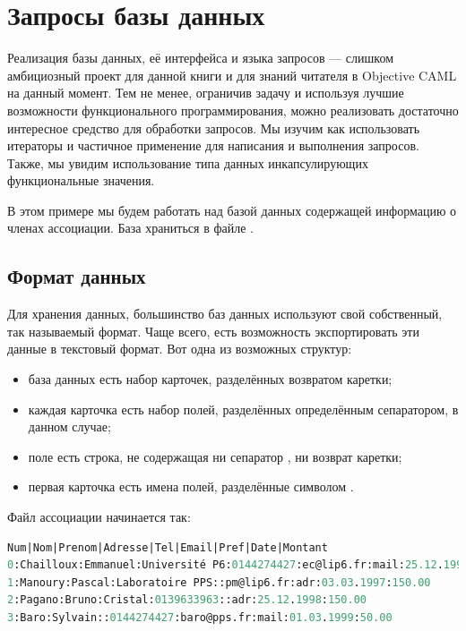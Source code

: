 \section{Запросы базы данных}
\label{sec:database_queries}

Реализация базы данных, её интерфейса и языка запросов --- слишком амбициозный 
проект для данной книги и для знаний читателя в Objective CAML на данный момент. 
Тем не менее, ограничив задачу и используя лучшие возможности функционального 
программирования, можно реализовать достаточно интересное средство для обработки 
запросов. Мы изучим как использовать итераторы и частичное применение для 
написания и выполнения запросов. Также, мы увидим использование типа данных 
инкапсулирующих функциональные значения.

В этом примере мы будем работать над базой данных содержащей информацию о членах 
ассоциации. База храниться в файле .

\subsection{Формат данных}
\label{subsec:data_format}

Для хранения данных, большинство баз данных используют свой собственный, так 
называемый  формат. Чаще всего, есть возможность 
экспортировать эти данные в текстовый формат. Вот одна из возможных структур:

\begin{itemize}
	\item база данных есть набор карточек, разделённых возвратом каретки;

	\item каждая карточка есть набор полей, разделённых определённым 
сепаратором,  в данном случае;

	\item поле есть строка, не содержащая ни сепаратор , ни возврат 
каретки;

	\item первая карточка есть имена полей, разделённые символом .
\end{itemize}

Файл ассоциации начинается так:

\begin{lstlisting}[language=OCaml]
Num|Nom|Prenom|Adresse|Tel|Email|Pref|Date|Montant
0:Chailloux:Emmanuel:Université P6:0144274427:ec@lip6.fr:mail:25.12.1998:100.00
1:Manoury:Pascal:Laboratoire PPS::pm@lip6.fr:adr:03.03.1997:150.00
2:Pagano:Bruno:Cristal:0139633963::adr:25.12.1998:150.00
3:Baro:Sylvain::0144274427:baro@pps.fr:mail:01.03.1999:50.00
\end{lstlisting}

